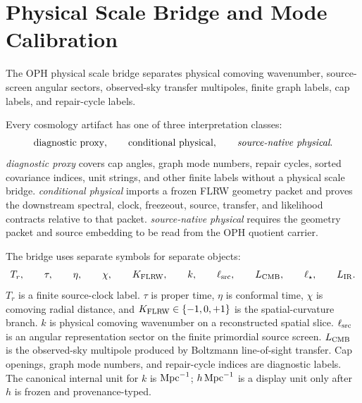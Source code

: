 \section{Physical Scale Bridge and Mode Calibration}\label{sec:physical-scale-bridge}

The OPH physical scale bridge separates
physical comoving wavenumber, source-screen angular sectors, observed-sky transfer multipoles,
finite graph labels, cap labels, and repair-cycle labels.

\begin{definition}\label{def:cosmology-claim-tiers}
Every cosmology artifact has one of three interpretation classes:
\[
\text{diagnostic proxy},\qquad
\text{conditional physical},\qquad
\emph{source-native physical}.
\]
\emph{diagnostic proxy} covers cap angles, graph mode numbers, repair cycles, sorted covariance
indices, unit strings, and other finite labels without a physical scale bridge.
\emph{conditional physical} imports a frozen FLRW geometry packet and proves the downstream
spectral, clock, freezeout, source, transfer, and likelihood contracts relative to that packet.
\emph{source-native physical} requires the geometry packet and source embedding to be read from the
OPH quotient carrier.
\end{definition}

\begin{definition}\label{def:cosmology-notation-firewall}
The bridge uses separate symbols for separate objects:
\[
T_r,\qquad \tau,\qquad \eta,\qquad \chi,\qquad K_{\rm FLRW},\qquad
k,\qquad \ell_{\rm src},\qquad L_{\rm CMB},\qquad \ell_\star,\qquad L_{\rm IR}.
\]
\(T_r\) is a finite source-clock label.  \(\tau\) is proper time, \(\eta\) is conformal time,
\(\chi\) is comoving radial distance, and \(K_{\rm FLRW}\in\{-1,0,+1\}\) is the spatial-curvature
branch.  \(k\) is physical comoving wavenumber on a reconstructed spatial slice.
\(\ell_{\rm src}\) is an angular representation sector on the finite primordial source screen.
\(L_{\rm CMB}\) is the observed-sky multipole produced by Boltzmann line-of-sight transfer.
Cap openings, graph mode numbers, and repair-cycle indices are diagnostic labels.  The canonical
internal unit for \(k\) is \({\rm Mpc}^{-1}\); \(h\,{\rm Mpc}^{-1}\) is a display unit only after
\(h\) is frozen and provenance-typed.
\end{definition}

